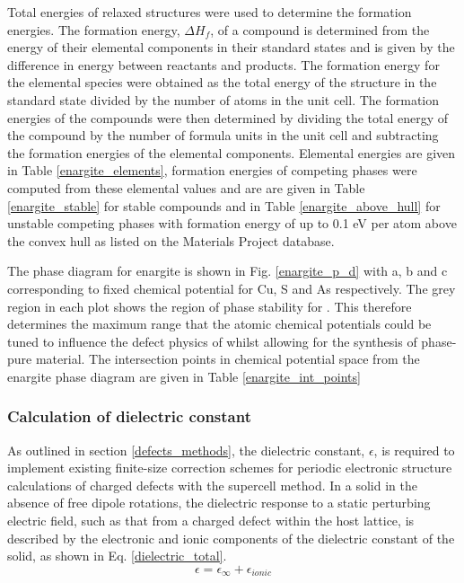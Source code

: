 \documentclass[11pt, twoside]{report}
\begin{document}
Total energies of relaxed structures were used to determine the formation energies.
The formation energy, $\Delta H_f$, of a compound is determined from the energy of their elemental components in their standard states and is given by the difference in energy between reactants and products.
The formation energy for the elemental species were obtained as the total energy of the structure in the standard state divided by the number of atoms in the unit cell. The formation energies of the compounds were then determined by dividing the total energy of the compound by the number of formula units in the unit cell and subtracting the formation energies of the elemental components.
Elemental energies are given in Table \ref{enargite_elements}, formation energies of competing phases were computed from these elemental values and are are given in Table \ref{enargite_stable} for stable compounds and in Table \ref{enargite_above_hull} for unstable competing phases with formation energy of up to 0.1 eV per atom above the convex hull as listed on the Materials Project database.


The phase diagram for enargite is shown in Fig. \ref{enargite_p_d} with a, b and c corresponding to fixed chemical potential for Cu, S and As respectively. The grey region in each plot shows the region of phase stability for {\enargite}. This therefore determines the maximum range that the atomic chemical potentials could be tuned to influence the defect physics of {\enargite} whilst allowing for the synthesis of phase-pure material. The intersection points in chemical potential space from the enargite phase diagram are given in Table \ref{enargite_int_points}



\subsubsection{Calculation of dielectric constant}

As outlined in section \ref{defects_methods}, the dielectric constant, $\epsilon$, is required to implement existing finite-size correction schemes for periodic electronic structure calculations of charged defects with the supercell method. 
In a solid in the absence of free dipole rotations, the dielectric response to a static perturbing electric field, such as that from a charged defect within the host lattice, is described by the electronic and ionic components of the dielectric constant of the solid, as shown in Eq. \ref{dielectric_total}. 
\begin{equation} \label{dielectric_total}
\epsilon = \epsilon_{\infty} + \epsilon_{ionic}
\end{equation}
\end{document}
